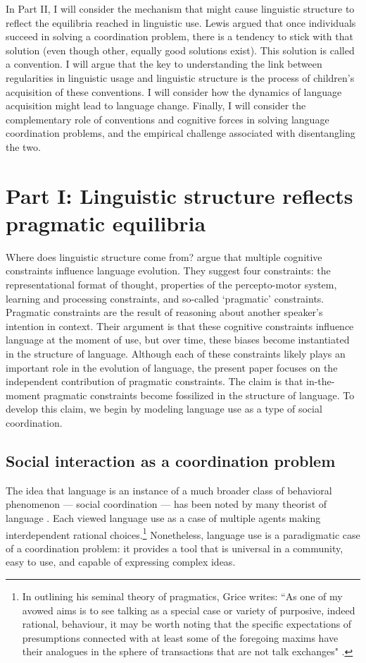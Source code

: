 \documentclass[man, noapacite, 12pt]{apa2}
\begin{document}
In Part II, I will consider the mechanism that might cause linguistic structure to reflect the equilibria reached in linguistic use. Lewis argued that once individuals succeed in solving a coordination problem, there is a tendency to stick with that solution (even though other, equally good solutions exist). This solution is called a convention. I will argue that the key to understanding the link between regularities in linguistic usage and linguistic structure is the process of children's acquisition of these conventions. I will consider how the dynamics of language acquisition might lead to language change. Finally, I will consider the complementary role of conventions and cognitive forces in solving language coordination problems, and the  empirical challenge associated with disentangling the two.

\section{Part I: Linguistic structure reflects pragmatic equilibria}

Where does linguistic structure come from?  argue that  multiple cognitive constraints influence language evolution. They suggest four constraints: the representational format of thought, properties of the percepto-motor system, learning and processing constraints, and so-called `pragmatic' constraints. Pragmatic constraints are the result of reasoning about another speaker's intention in context. Their argument is that these  cognitive constraints  influence  language at the moment of use, but over time, these biases become instantiated in the structure of language. Although each of these constraints likely plays an important role in the evolution of language, the present paper focuses on the independent contribution of pragmatic constraints. The claim is that in-the-moment pragmatic constraints become fossilized in the structure of language. To develop this claim, we begin by modeling language use as a type of social coordination.

\subsection{Social interaction as a coordination problem}
The idea that language is an instance of a much broader class of behavioral phenomenon --- social coordination --- has been noted by many theorist of language \cite{zipf1936, lewis1969convention, grice1975logic, clark1996using}. Each viewed language use as a case of multiple agents making interdependent  rational choices.\footnote{In outlining his seminal theory of pragmatics, Grice  writes: ``As one of my avowed aims is to see talking as a special case or variety of purposive, indeed rational, behaviour, it may be worth noting that the specific expectations of presumptions connected with at least some of the foregoing maxims have their analogues in the sphere of transactions that are not talk exchanges" \cite[pg. 47]{grice1975logic}.} Nonetheless, language use is a paradigmatic case of a coordination problem: it provides a tool that is universal in a community, easy to use, and capable of expressing complex ideas.
\end{document}
